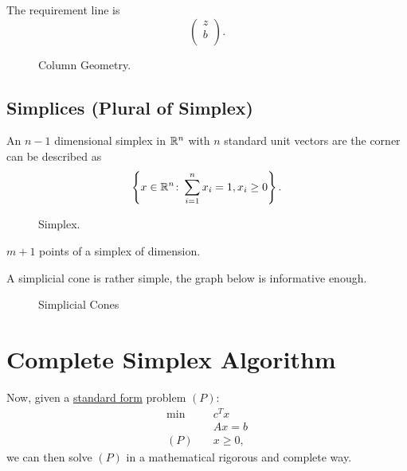The requirement line is
\[
	\begin{pmatrix}
		z \\
		b \\
	\end{pmatrix}.
\]

\begin{figure}[H]
	\centering
	\caption{Column Geometry.}
	\label{fig:column-geometry}
\end{figure}

\subsection{Simplices (Plural of Simplex)}
\begin{eg}[Simplex]
	An \(n-1\) dimensional simplex in \(\mathbb{\MakeUppercase{R}}^n\) with \(n\) standard unit vectors are the corner can be described as
	\[
		\left\{x\in \mathbb{\MakeUppercase{R}}^n \colon \sum\limits_{i=1}^{n} x_i = 1, x_i \geq 0\right\}.
	\]
	\begin{figure}[H]
		\centering
		\caption{Simplex.}
		\label{fig:simplex}
	\end{figure}
\end{eg}

\begin{note}
	\(m+1\) points of a simplex of dimension.
\end{note}

A simplicial cone is rather simple, the graph below is informative enough.
\begin{figure}[H]
	\centering
	\caption{Simplicial Cones}
	\label{fig:simplicial-cones}
\end{figure}

\section{Complete Simplex Algorithm}
Now, given a \hyperref[def:standard-form]{standard form} problem \((P)\):
\begin{align*}
	\min~    & c^Tx     \\
	         & Ax = b   \\
	(P)\quad & x\geq 0,
\end{align*}
we can then solve \((P)\) in a mathematical rigorous and complete way.


